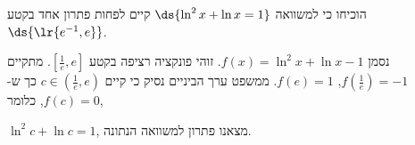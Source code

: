 הוכיחו כי למשוואה
$\ds{\ln^2x+\ln x=1}$
קיים לפחות פתרון אחד בקטע $\ds{\lr{e^{-1},e}}$.
\begin{solbox}
נסמן
$f(x)=\ln^2x+\ln x-1$.
זוהי פונקציה רציפה בקטע
$[\tfrac{1}{e},e]$.
מתקיים
$f(\tfrac{1}{e})=-1$,
$f(e)=1$.
ממשפט ערך הביניים נסיק כי קיים
$c\in(\tfrac{1}{e},e)$
כך ש-
$f(c)=0$,
כלומר,

$\ln^2c+\ln c=1$,
מצאנו פתרון למשוואה הנתונה.
\end{solbox}
